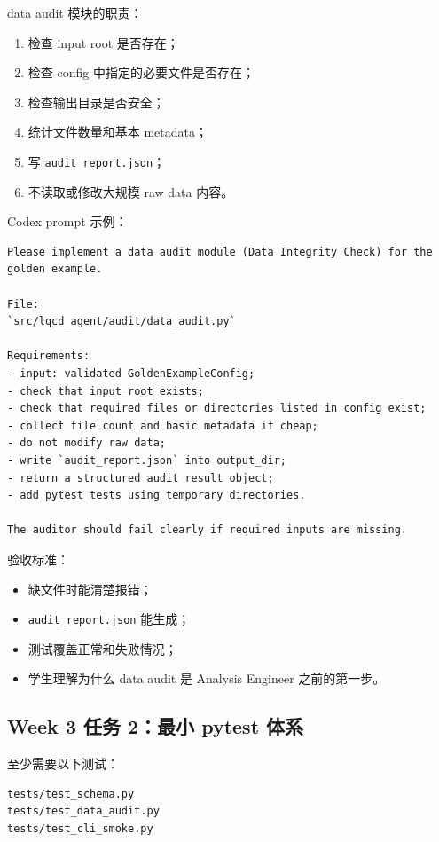 \documentclass[11pt,a4paper,fontset=fandol]{ctexart}
\begin{document}
data audit 模块的职责：

\begin{enumerate}[leftmargin=2em]
  \item 检查 input root 是否存在；
  \item 检查 config 中指定的必要文件是否存在；
  \item 检查输出目录是否安全；
  \item 统计文件数量和基本 metadata；
  \item 写 \texttt{audit\_report.json}；
  \item 不读取或修改大规模 raw data 内容。
\end{enumerate}

Codex prompt 示例：

\begin{lstlisting}
Please implement a data audit module (Data Integrity Check) for the golden example.

File:
`src/lqcd_agent/audit/data_audit.py`

Requirements:
- input: validated GoldenExampleConfig;
- check that input_root exists;
- check that required files or directories listed in config exist;
- collect file count and basic metadata if cheap;
- do not modify raw data;
- write `audit_report.json` into output_dir;
- return a structured audit result object;
- add pytest tests using temporary directories.

The auditor should fail clearly if required inputs are missing.
\end{lstlisting}

验收标准：

\begin{itemize}[leftmargin=2em]
  \item 缺文件时能清楚报错；
  \item \texttt{audit\_report.json} 能生成；
  \item 测试覆盖正常和失败情况；
  \item 学生理解为什么 data audit 是 Analysis Engineer 之前的第一步。
\end{itemize}

\subsection{Week 3 任务 2：最小 pytest 体系}

至少需要以下测试：

\begin{lstlisting}
tests/test_schema.py
tests/test_data_audit.py
tests/test_cli_smoke.py
\end{lstlisting}
\end{document}
